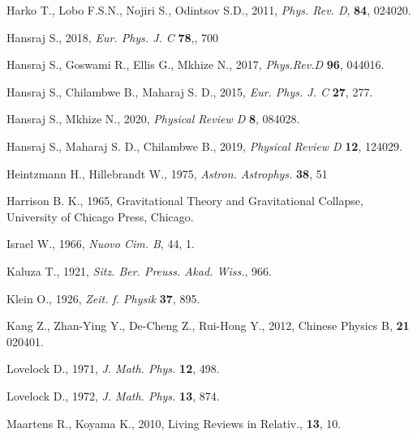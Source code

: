 \documentclass[]{aastex631}
\begin{document}
\begin{thebibliography}{99}
  Harko T.,  Lobo F.S.N.,  Nojiri S.,  Odintsov S.D., 2011, {\em Phys. Rev. D}, {\bf 84}, 024020.

  Hansraj S., 2018, {\em  Eur. Phys. J. C} {\bf 78},,  700 

  Hansraj S.,  Goswami R.,  Ellis G.,  Mkhize N.,  2017, {\em  Phys.Rev.D} {\bf  96}, 044016.

  Hansraj S.,  Chilambwe B.,  Maharaj S. D.,  2015, {\em Eur. Phys. J. C } {\bf 27}, 277.

  Hansraj S.,  Mkhize N.,  2020, {\em Physical Review D} {\bf  8},  084028.

    Hansraj S., Maharaj S. D.,  Chilambwe B.,  2019, {\em Physical Review D} {\bf 12}, 124029.

  Heintzmann H.,  Hillebrandt W., 1975, {\em Astron. Astrophys.} {\bf 38}, 51 

  Harrison B. K., 1965, Gravitational Theory and Gravitational Collapse, University of Chicago Press, Chicago.

 Israel W., 1966, {\em Nuovo Cim. B}, { 44}, 1.

   Kaluza T.,  1921, {\em  Sitz. Ber. Preuss. Akad. Wiss.},  966.

   Klein O.,  1926, {\em  Zeit. f. Physik} \textbf{37},  895.

  Kang Z.,  Zhan-Ying Y.,  De-Cheng Z.,  Rui-Hong Y.,  2012, {Chinese Physics B}, {\bf 21} 020401.

  Lovelock D., 1971, {\em J. Math. Phys.} {\bf 12}, 498.

  Lovelock D.,  1972, {\em J. Math. Phys.} {\bf 13}, 874.


  Maartens R., Koyama K.,  2010, {Living Reviews in Relativ.}, {\bf 13}, 10.


\end{thebibliography}
\end{document}
